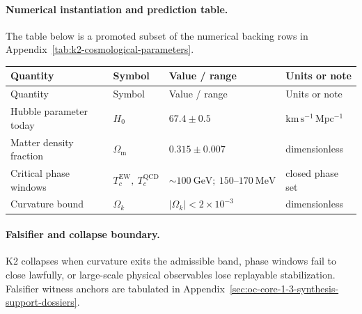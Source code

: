 \paragraph{Numerical instantiation and prediction table.}
The table below is a promoted subset of the numerical backing rows in Appendix~\ref{tab:k2-cosmological-parameters}.
\begin{longtable}{@{}L{0.27\textwidth}L{0.15\textwidth}L{0.24\textwidth}L{0.16\textwidth}@{}}
\toprule
Quantity & Symbol & Value / range & Units or note \\
\midrule
\endfirsthead
\toprule
Quantity & Symbol & Value / range & Units or note \\
\midrule
\endhead
Hubble parameter today & $\scriptstyle H_0$ & $67.4 \pm 0.5$ & $\mathrm{km\,s^{-1}\,Mpc^{-1}}$ \\
Matter density fraction & $\scriptstyle \Omega_{\mathrm{m}}$ & $0.315 \pm 0.007$ & dimensionless \\
Critical phase windows & $\scriptstyle T_c^{\mathrm{EW}},\allowbreak \ T_c^{\mathrm{QCD}}$ & $\sim 100\ \mathrm{GeV};\allowbreak \ 150\text{--}170\ \mathrm{MeV}$ & closed phase set \\
Curvature bound & $\scriptstyle \Omega_k$ & $|\Omega_k| < 2 \times 10^{-3}$ & dimensionless \\
\bottomrule
\end{longtable}

\paragraph{Falsifier and collapse boundary.}
K2 collapses when curvature exits the admissible band, phase windows fail to close lawfully, or large-scale physical observables lose replayable stabilization.
Falsifier witness anchors are tabulated in Appendix~\ref{sec:oc-core-1-3-synthesis-support-dossiers}.

